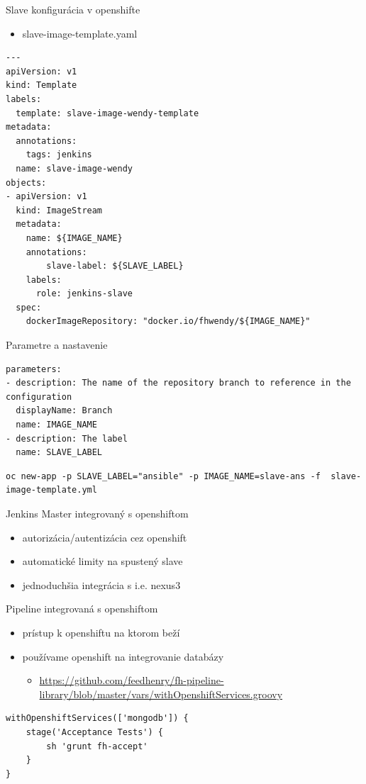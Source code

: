 \documentclass[bigger]{beamer}
\begin{document}
\begin{frame}[fragile,label={sec:orgcf6e538}]{Slave konfigurácia v openshifte}
 \begin{itemize}
\item slave-image-template.yaml
\end{itemize}
\begin{verbatim}
---
apiVersion: v1
kind: Template
labels:
  template: slave-image-wendy-template
metadata:
  annotations:
    tags: jenkins
  name: slave-image-wendy
objects:
- apiVersion: v1
  kind: ImageStream
  metadata:
    name: ${IMAGE_NAME}
    annotations:
        slave-label: ${SLAVE_LABEL}
    labels:
      role: jenkins-slave
  spec:
    dockerImageRepository: "docker.io/fhwendy/${IMAGE_NAME}"
\end{verbatim}
\end{frame}
\begin{frame}[fragile,label={sec:org44c3652}]{Parametre a nastavenie}
 \begin{verbatim}
parameters:
- description: The name of the repository branch to reference in the configuration
  displayName: Branch
  name: IMAGE_NAME
- description: The label
  name: SLAVE_LABEL
\end{verbatim}

\begin{verbatim}
oc new-app -p SLAVE_LABEL="ansible" -p IMAGE_NAME=slave-ans -f  slave-image-template.yml
\end{verbatim}
\end{frame}

\begin{frame}[label={sec:orgcb8a576}]{Jenkins Master integrovaný s openshiftom}
\begin{itemize}
\item autorizácia/autentizácia cez openshift
\item automatické limity na spustený slave
\item jednoduchšia integrácia s i.e. nexus3
\end{itemize}
\end{frame}

\begin{frame}[fragile,label={sec:orgd27d721}]{Pipeline integrovaná s openshiftom}
 \begin{itemize}
\item prístup k openshiftu na ktorom beží
\item používame openshift na integrovanie databázy
\begin{itemize}
\item \url{https://github.com/feedhenry/fh-pipeline-library/blob/master/vars/withOpenshiftServices.groovy}
\end{itemize}
\end{itemize}
\begin{verbatim}
withOpenshiftServices(['mongodb']) {
    stage('Acceptance Tests') {
        sh 'grunt fh-accept'
    }
}
\end{verbatim}
\end{frame}
\end{document}
